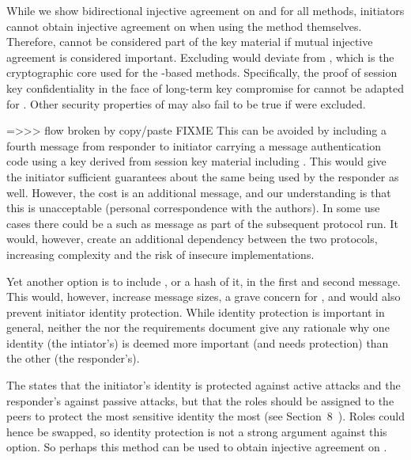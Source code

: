 \documentclass[runningheads, envcountsame, a4paper, draft, x11names]{llncs}
\begin{document}
While we show bidirectional injective agreement on \mGx{} and \mGy{}
for all methods, initiators cannot obtain injective agreement on \mGiy{} when
using the \mStat{} method themselves. Therefore, \mGiy{} cannot be considered
part of the key material if mutual injective agreement is considered important.
%
Excluding \mGiy{} would deviate from \mOptls{}, which is the cryptographic core
used for the \mStat-based methods. Specifically, the proof of session key
confidentiality in the face of long-term key compromise for \mOptls{} cannot be
adapted for \mEdhoc{}.
%
Other security properties of \mOptls{} may also fail to be true if
\mGiy{} were excluded. 
%

=>>> flow broken by copy/paste FIXME
This can be avoided by including a fourth message from responder to initiator
carrying a message authentication code using a key derived from session key
material including \mGiy{}.
%
This would give the initiator sufficient guarantees about the same \mGiy{}
being used by the responder as well.
%
However, the cost is an additional message, and our understanding is that this
is unacceptable (personal correspondence with the \mSpec{} authors).
%
In some use cases there could be a such as message as part of
the subsequent \mOscore{} protocol run. It would, however, create an additional
dependency between the two protocols, increasing complexity and the risk of
insecure implementations.
%

Yet another option is to include \mGi{}, or a hash of it, in the first and
second message.
%
This would, however, increase message sizes, a grave concern for \mEdhoc{},
and would also prevent initiator identity protection.
%
While identity protection is important in general, neither the \mSpec{} nor
the requirements document give any rationale why one identity (the intiator's)
is deemed more important (and needs protection) than the other
(the responder's).
%

The \mSpec{} states that the initiator's identity is protected against active
attacks and the responder's against passive attacks, but that the roles should
be assigned to the \mCoap{} peers to protect the most sensitive identity the
most (see Section~8~\cite{selander-lake-edhoc-01}).
%
Roles could hence be swapped, so identity protection is not a strong argument
against this option.
%
So perhaps this method can be used to obtain injective agreement on \mGiy.
%
%
\end{document}
